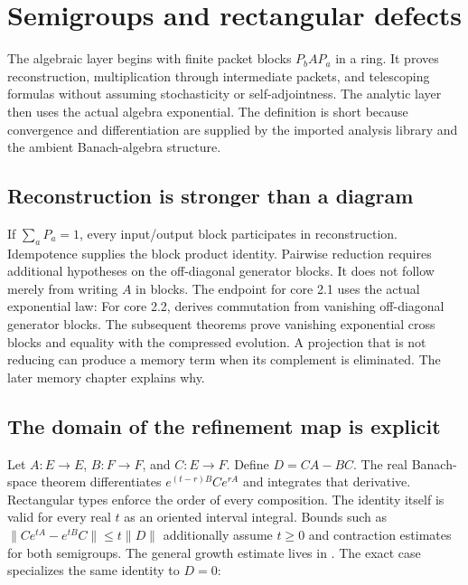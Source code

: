 \clearpage\section{Semigroups and rectangular defects}
\label{sec:semigroups}
The algebraic layer begins with finite packet blocks $P_bAP_a$ in a ring. It proves reconstruction, multiplication through intermediate packets, and telescoping formulas without assuming stochasticity or self-adjointness. The analytic layer then uses the actual algebra exponential. The definition is short because convergence and differentiation are supplied by the imported analysis library and the ambient Banach-algebra structure.

\subsection{Reconstruction is stronger than a diagram}
If $\sum_aP_a=1$, every input/output block participates in reconstruction. Idempotence supplies the block product identity. Pairwise reduction requires additional hypotheses on the off-diagonal generator blocks. It does not follow merely from writing $A$ in blocks. The endpoint for core 2.1 uses the actual exponential law:
For core 2.2,  derives commutation from vanishing off-diagonal generator blocks. The subsequent theorems prove vanishing exponential cross blocks and equality with the compressed evolution. A projection that is not reducing can produce a memory term when its complement is eliminated. The later memory chapter explains why.

\subsection{The domain of the refinement map is explicit}
Let $A:E\to E$, $B:F\to F$, and $C:E\to F$. Define $D=CA-BC$. The real Banach-space theorem differentiates $e^{(t-r)B}Ce^{rA}$ and integrates that derivative. Rectangular types enforce the order of every composition.
The identity itself is valid for every real $t$ as an oriented interval integral. Bounds such as $\|Ce^{tA}-e^{tB}C\|\le t\|D\|$ additionally assume $t\ge0$ and contraction estimates for both semigroups. The general growth estimate lives in . The exact case specializes the same identity to $D=0$:

